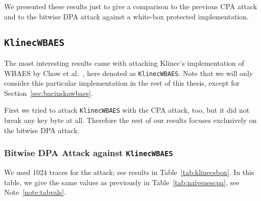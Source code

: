 	We presented these results just to give a comparison to the previous CPA attack and to the bitwise DPA attack against a white-box protected implementation.



\subsection{\tt KlinecWBAES}
\label{sec:klinecwbaes}

The most interesting results came with attacking Klinec's implementation \cite{klinec2013implementation} of WBAES by Chow et al.\ \cite{chow2002aes}, here denoted as {\tt KlinecWBAES}. Note that we will only consider this particular implementation in the rest of this thesis, except for Section~\ref{sec:bacinskawbaes}.

First we tried to attack {\tt KlinecWBAES} with the CPA attack, too, but it did not break any key byte at all. Therefore the rest of our results focuses exclusively on the bitwise DPA attack.

\subsubsection{Bitwise DPA Attack against {\tt KlinecWBAES}}
	
	We used $1024$ traces for the attack; see results in Table~\ref{tab:klinecsbox}. In this table, we give the same values as previously in Table~\ref{tab:naiveaescpa}, see Note~\ref{note:tabvals}.
	
	
